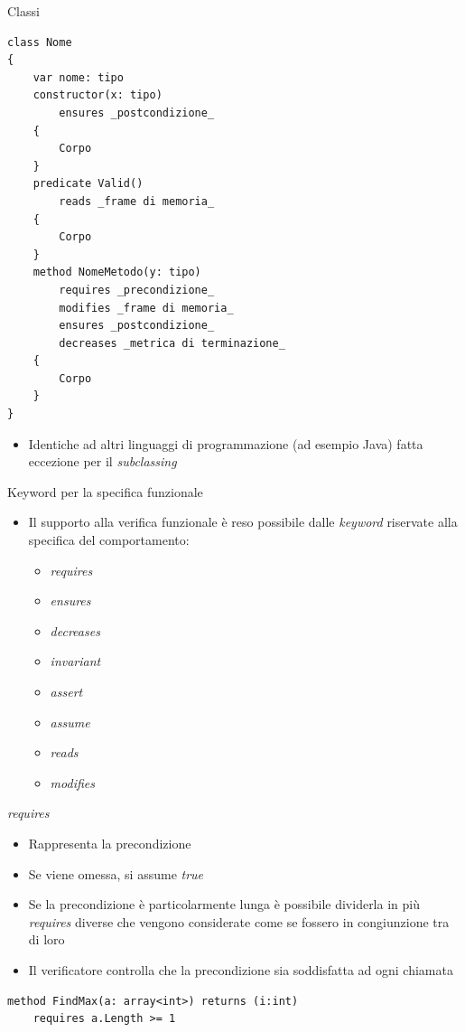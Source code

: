 \documentclass[]{beamer}
\begin{document}
\begin{frame}[containsverbatim]{Classi}
\lstset{linewidth=11cm}
\begin{lstlisting}[basicstyle=\tiny]
class Nome
{
    var nome: tipo
    constructor(x: tipo)
        ensures _postcondizione_
    {
        Corpo
    }
    predicate Valid()
        reads _frame di memoria_
    {
        Corpo
    }
    method NomeMetodo(y: tipo)
        requires _precondizione_
        modifies _frame di memoria_
        ensures _postcondizione_
        decreases _metrica di terminazione_
    {
        Corpo
    }   
}
\end{lstlisting}
\begin{itemize}
    \item Identiche ad altri linguaggi di programmazione (ad esempio Java) fatta eccezione per il \textit{subclassing}
\end{itemize}
\end{frame}

\begin{frame}{Keyword per la specifica funzionale}
    \begin{itemize}
        \item Il supporto alla verifica funzionale è reso possibile dalle \textit{keyword} riservate alla specifica del comportamento: \begin{itemize}
            \item \textit{requires}
            \item \textit{ensures}
            \item \textit{decreases}
            \item \textit{invariant}
            \item \textit{assert}
            \item \textit{assume}
            \item \textit{reads}
            \item \textit{modifies}
        \end{itemize}
    \end{itemize}
\end{frame}

\begin{frame}[containsverbatim]{\textit{requires}}
    \begin{itemize}
        \item Rappresenta la precondizione
        \item Se viene omessa, si assume \textit{true}
        \item Se la precondizione è particolarmente lunga è possibile dividerla in più \textit{requires} diverse che vengono considerate come se fossero in congiunzione tra di loro
        \item Il verificatore controlla che la precondizione sia soddisfatta ad ogni chiamata
    \end{itemize}
\lstset{linewidth=11cm}
\begin{lstlisting}
method FindMax(a: array<int>) returns (i:int)
    requires a.Length >= 1
\end{lstlisting}
\end{frame}
\end{document}
